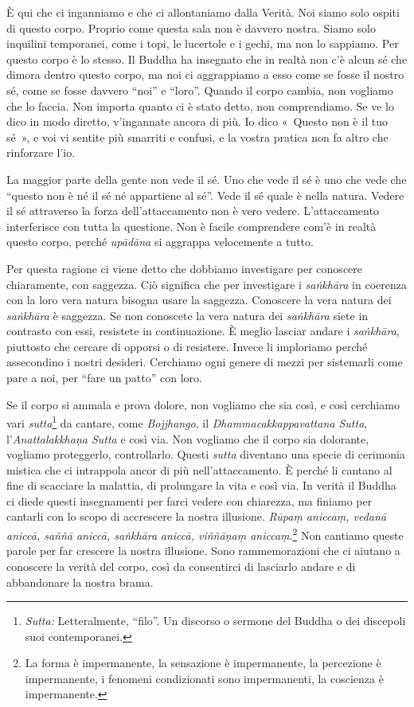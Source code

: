 È qui che ci inganniamo e che ci allontaniamo dalla Verità. Noi siamo
solo ospiti di questo corpo. Proprio come questa sala non è davvero
nostra. Siamo solo inquilini temporanei, come i topi, le lucertole e i
gechi, ma non lo sappiamo. Per questo corpo è lo stesso. Il Buddha ha
insegnato che in realtà non c'è alcun sé che dimora dentro questo corpo,
ma noi ci aggrappiamo a esso come se fosse il nostro sé, come se fosse
davvero ``noi'' e ``loro''. Quando il corpo cambia, non vogliamo che lo
faccia. Non importa quanto ci è stato detto, non comprendiamo. Se ve lo
dico in modo diretto, v'ingannate ancora di più. Io dico «~Questo non è
il tuo sé~», e voi vi sentite più smarriti e confusi, e la vostra
pratica non fa altro che rinforzare l'io.

La maggior parte della gente non vede il sé. Uno che vede il sé è uno
che vede che ``questo non è né il sé né appartiene al sé''. Vede il sé
quale è nella natura. Vedere il sé attraverso la forza
dell'attaccamento non è vero vedere. L'attaccamento interferisce con
tutta la questione. Non è facile comprendere com'è in realtà questo
corpo, perché \emph{upādāna} si aggrappa velocemente a tutto.

Per questa ragione ci viene detto che dobbiamo investigare per conoscere
chiaramente, con saggezza. Ciò significa che per investigare i
\emph{saṅkhāra} in coerenza con la loro vera natura bisogna usare la
saggezza. Conoscere la vera natura dei \emph{saṅkhāra} è saggezza. Se
non conoscete la vera natura dei \emph{saṅkhāra} siete in contrasto con
essi, resistete in continuazione. È meglio lasciar andare i
\emph{saṅkhāra}, piuttosto che cercare di opporsi o di resistere. Invece
li imploriamo perché assecondino i nostri desideri. Cerchiamo ogni
genere di mezzi per sistemarli come pare a noi, per ``fare un patto''
con loro.

Se il corpo si ammala e prova dolore, non vogliamo che sia così, e così
cerchiamo vari \emph{sutta}\footnote{\emph{Sutta:} Letteralmente,
  ``filo''. Un discorso o sermone del Buddha o dei discepoli suoi
  contemporanei.} da cantare, come \emph{Bojjhango}, il
\emph{Dhammacakkappavattana Sutta}, l'\emph{Anattalakkhaṇa Sutta} e così
via. Non vogliamo che il corpo sia dolorante, vogliamo proteggerlo,
controllarlo. Questi \emph{sutta} diventano una specie di cerimonia
mistica che ci intrappola ancor di più nell'attaccamento. È perché li
cantano al fine di scacciare la malattia, di prolungare la vita e così
via. In verità il Buddha ci diede questi insegnamenti per farci vedere
con chiarezza, ma finiamo per cantarli con lo scopo di accrescere la
nostra illusione. \emph{Rūpaṃ aniccaṃ, vedanā aniccā, saññā aniccā,
saṅkhāra} \emph{aniccā, viññāṇaṃ aniccaṃ}.\footnote{La forma è
  impermanente, la sensazione è impermanente, la percezione è
  impermanente, i fenomeni condizionati sono impermanenti, la coscienza
  è impermanente.} Non cantiamo queste parole per far crescere la nostra
illusione. Sono rammemorazioni che ci aiutano a conoscere la verità del
corpo, così da consentirci di lasciarlo andare e di abbandonare la
nostra brama.

